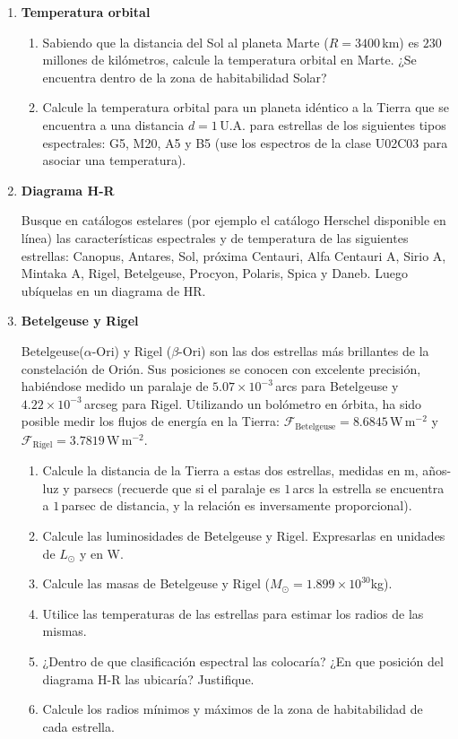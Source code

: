 \documentclass[a4paper,12pt]{article}
\begin{document}
\begin{enumerate}
\item{\bf{Temperatura orbital}}
	
\begin{enumerate}
	\item Sabiendo que la distancia del Sol al planeta Marte ($R=3400$\,km) es
		$230$ millones de kilómetros, calcule la temperatura orbital en Marte.
		¿Se encuentra dentro de la zona de habitabilidad Solar?
	\item Calcule la temperatura orbital para un planeta idéntico a la Tierra
		que se encuentra a una distancia $d=1$\,U.A. para estrellas de los
		siguientes tipos espectrales: G5, M20, A5 y B5 (use los espectros de la
		clase U02C03 para asociar una temperatura).
\end{enumerate}

\item {\bf{Diagrama H-R}}

	Busque en catálogos estelares (por ejemplo el catálogo Herschel disponible
		en línea) las características espectrales y de temperatura de las
		siguientes estrellas: Canopus, Antares, Sol, próxima Centauri, Alfa
		Centauri A, Sirio A, Mintaka A, Rigel, Betelgeuse, Procyon, Polaris,
		Spica y Daneb. Luego ubíquelas en un diagrama de HR.

\item{\bf{Betelgeuse y Rigel}}

Betelgeuse($\alpha$-Ori) y Rigel ($\beta$-Ori) son las dos estrellas más
brillantes de la constelación de Orión. Sus posiciones se conocen con excelente
precisión, habiéndose medido un paralaje de $5.07\times10^{-3}$\,arcs para
Betelgeuse y $4.22\times10^{-3}$\,arcseg para Rigel. Utilizando un bolómetro
en órbita, ha sido posible medir los flujos de energía en la Tierra:
$\mathcal{F}_{\mathrm{Betelgeuse}} = 8.6845$\,W\,m$^{-2}$ y
$\mathcal{F}_{\mathrm{Rigel}} = 3.7819$\,W\,m$^{-2}$.
\begin{enumerate}
	\item Calcule la distancia de la Tierra a estas dos estrellas, medidas en
		m, años-luz y parsecs (recuerde que si el paralaje es $1$\,arcs la
		estrella se encuentra a $1$\,parsec de distancia, y la relación es
		inversamente proporcional).
	\item Calcule las luminosidades de Betelgeuse y Rigel.  Expresarlas en
		unidades de $L_\odot$ y en W.
	\item Calcule las masas de Betelgeuse y Rigel ($M_\odot =
		1.899\times10^{30}$kg).
	\item Utilice las temperaturas de las estrellas para estimar los radios de
		las mismas. 
	\item ¿Dentro de que clasificación espectral las colocaría? ¿En que
		posición del diagrama H-R las ubicaría? Justifique.
	\item Calcule los radios mínimos y máximos de la zona de habitabilidad de
		cada estrella.
\end{enumerate}


\end{enumerate}
\end{document}
